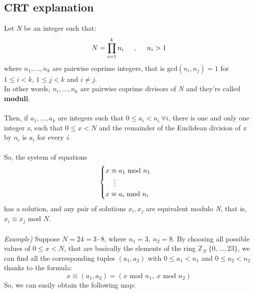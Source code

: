 \documentclass[11pt, a4paper]{article}
\newcommand{\inoltre}{\hspace{0.5cm},\hspace{0.5cm}}
\newcommand{\mymod}{
    \text{ mod }
}
\begin{document}
\subsection{CRT explanation}
Let \textit{N} be an integer such that:
$$N=\prod_{i=1}^kn_i\inoltre n_i>1$$
where $n_1,...,n_k$ are pairwise coprime integers, that is $\text{gcd}(n_i,n_j)=1$ for $1\le i<k$, $1\le j<k$ and $i\ne j$.\\In other words, $n_i,...,n_k$ are pairwise coprime divisors of \textit{N} and they're called \textbf{moduli}.\\\\
Then, if $a_1,...,a_k$ are integers such that $0\le a_i<n_i \ \forall i$, there is one and only one integer \textit{x}, such that $0\le x<N$ and the remainder of the Euclidean division of \textit{x} by $n_i$ is $a_i$ for every \textit{i}.\\\\
So, the system of equations
\begin{equation*}
    \begin{cases}
        x\equiv a_1\mymod n_1\\
        \hspace{0.42cm}\vdots\\
        x\equiv a_i\mymod n_i
    \end{cases}
\end{equation*}
has a solution, and any pair of solutions $x_i,x_j$ are equivalent modulo \textit{N}, that is, $x_i\equiv x_j\mymod N$.\\\\
\textit{Example)} Suppose $N=24=3\cdot8$, where $n_1=3,\ n_2=8$. By choosing all possible values of $0\le x<N$, that are basically the elements of the ring $\mathbb{Z}_N \ \{0,...,23\}$, we can find all the corresponding tuples $(a_1,a_2)$ with $0\le a_1<n_1$ and $0\le a_2<n_2$ thanks to the formula:
$$x\equiv (a_1, a_2)=(x\mymod n_1,\ x\mymod n_2)$$
So, we can easily obtain the following map:
\end{document}
